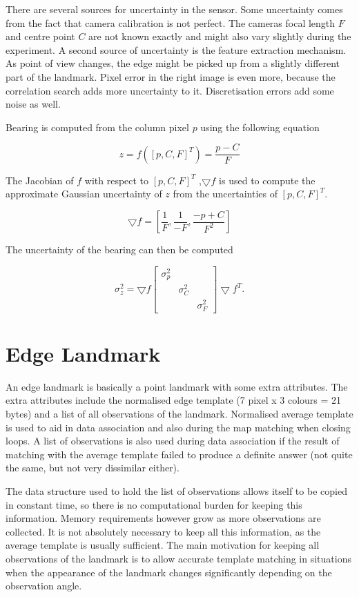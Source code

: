 There are several sources for uncertainty in the sensor. Some
uncertainty comes from the fact that camera calibration is not
perfect. The cameras focal length $F$ and centre point $C$ are not
known exactly and might also vary slightly during the experiment. A
second source of uncertainty is the feature extraction mechanism. As
point of view changes, the edge might be picked up from a slightly
different part of the landmark. Pixel error in the right image is even
more, because the correlation search adds more uncertainty to it.
Discretisation errors add some noise as well.

Bearing is computed from the column pixel $p$ using the following equation

$$
z = f([p,C,F]^T) = \frac{p - C}{F}
$$

The Jacobian of $f$ with respect to $[p,C,F]^T$ ,$\bigtriangledown f$ is used to compute the
approximate Gaussian uncertainty of $z$ from the uncertainties of
$[p,C,F]^T$.

$$
\bigtriangledown f = \left[ 
\frac{1}{F},
\frac{1}{-F},
\frac{-p + C}{F^2}
\right]
$$

The uncertainty of the bearing can then be computed

$$
\sigma^2_z = \bigtriangledown f \left[ \begin{array}{ccc}
      \sigma^2_p & & \\
   &  \sigma^2_C & \\
  & & \sigma^2_F 
\end{array} \right] \bigtriangledown f^T.
$$



\section{Edge Landmark}

An edge landmark is basically a point landmark with some extra
attributes. The extra attributes include the normalised edge template
(7 pixel x 3 colours = 21 bytes) and a list of all observations of the
landmark.  Normalised average template is used to aid in data
association and also during the map matching when closing loops. A
list of observations is also used during data association if the
result of matching with the average template failed to produce a
definite answer (not quite the same, but not very dissimilar either).

The data structure used to hold the list of observations allows itself
to be copied in constant time, so there is no computational burden for
keeping this information. Memory requirements however grow as more
observations are collected. It is not absolutely necessary to keep all
this information, as the average template is usually sufficient. The
main motivation for keeping all observations of the landmark is to
allow accurate template matching in situations when the appearance of
the landmark changes significantly depending on the observation angle.

